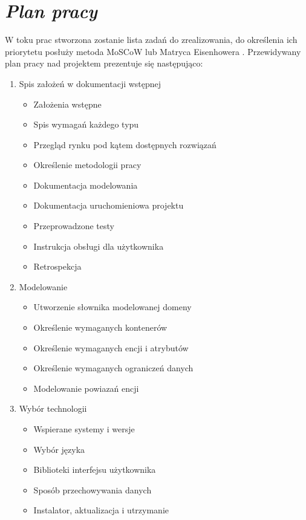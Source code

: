 \documentclass[a4paper,10pt, twoside]{report}
\newcommand{\customstylechapter}[1]{\large{\textit{#1}}}
\begin{document}
\chapter{\customstylechapter{Plan pracy}}
{W toku prac stworzona zostanie lista zadań do zrealizowania, do określenia ich 
priorytetu posłuży metoda MoSCoW \cite{MOSCOW} lub Matryca Eisenhowera 
\cite{MatrycaEisenhowera}. Przewidywany plan pracy nad projektem prezentuje się następująco:
\begin{enumerate}
    \item Spis założeń w dokumentacji wstępnej
    \begin{itemize}
        \item Założenia wstępne
        \item Spis wymagań każdego typu
        \item Przegląd rynku pod kątem dostępnych rozwiązań
        \item Określenie metodologii pracy
        \item Dokumentacja modelowania
        \item Dokumentacja uruchomieniowa projektu
        \item Przeprowadzone testy
        \item Instrukcja obsługi dla użytkownika
        \item Retrospekcja
    \end{itemize}
    \item Modelowanie 
    \begin{itemize}
        \item Utworzenie słownika modelowanej domeny
        \item Określenie wymaganych kontenerów
        \item Określenie wymaganych encji i atrybutów
        \item Określenie wymaganych ograniczeń danych
        \item Modelowanie powiazań encji
    \end{itemize}
    \item Wybór technologii
    \begin{itemize}
        \item Wspierane systemy i wersje
        \item Wybór języka
        \item Biblioteki interfejsu użytkownika
        \item Sposób przechowywania danych
        \item Instalator, aktualizacja i utrzymanie 

\end{itemize}
\end{enumerate}}
\end{document}
